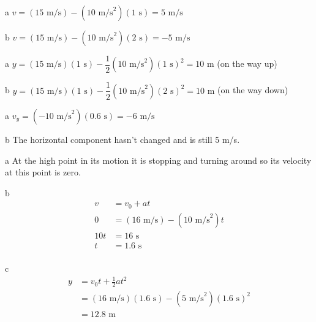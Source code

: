 \documentclass{exam}
\begin{document}
\begin{description}
\begin{description*}
\end{description*}

\item[E7]
\begin{description*}

\item[a] $v = (15 \text{ m/s}) - (10 \text{ m/s}^2) (1 \text{ s}) = 5 \text{ m/s}$

\item[b] $v = (15 \text{ m/s}) - (10 \text{ m/s}^2) (2 \text{ s}) = -5 \text{ m/s}$


\end{description*}

\item[E8]
\begin{description*}

\item[a] $y = (15 \text{ m/s}) (1 \text{ s}) - \dfrac{1}{2} (10 \text{ m/s}^2) (1 \text{ s})^2 = 10 \text{ m}$ (on the way up)
\item[b] $y = (15 \text{ m/s}) (1 \text{ s}) - \dfrac{1}{2} (10 \text{ m/s}^2) (2 \text{ s})^2 = 10 \text{ m}$ (on the way down)


\end{description*}

\item[E14]
\begin{description*}
\item[a] $v_y = (-10 \text{ m/s}^2) (0.6 \text{ s}) = -6 \text{ m/s}$
\item[b] The horizontal component hasn't changed and is still 5 m/s.
\end{description*}

\item[SP1]
\begin{description*}

\item[a] 
At the high point in its motion it is stopping and turning around so its velocity at this point is zero.

\item[b]
\begin{align*}
  v &= v_0 + at \\
  0 &= (16 \text{ m/s}) - (10 \text{ m/s}^2) t \\
  10t &= 16 \text{ s}\\
  t &= 1.6 \text{ s} \\
\end{align*}

\item[c]
\begin{align*}
  y &= v_0t + \frac{1}{2} at^2 \\
   &= (16 \text{ m/s}) (1.6 \text{ s}) - (5 \text{ m/s}^2) (1.6 \text{ s})^2 \\
   &= 12.8 \text{ m}
\end{align*}


\end{description*}
\end{description}
\end{document}
